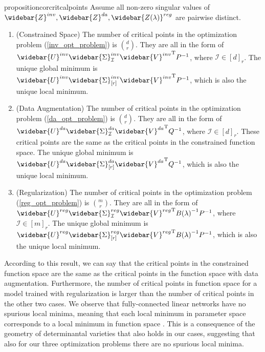 \documentclass{article}
\newcommand{\T}{\mathrm{T}}
\theoremstyle{plain}
\theoremstyle{definition}
\theoremstyle{remark}
\theoremstyle{remark}
\begin{document}
\begin{restatable}{proposition}{corcritcalpoints}
  \label{cor: critical_points}
Assume all non-zero singular values of $\widebar{Z}^{inv}, \widebar{Z}^{da}, \widebar{Z(\lambda)}^{reg}$ are pairwise distinct.
  \begin{enumerate}
    \item (Constrained Space) The number of critical points in the optimization problem (\ref{inv_opt_problem}) is $\binom{d}{r}$. They are all in the form of $\widebar{U}^{inv} \widebar{\Sigma}_{\mathcal{I}}^{inv} {\widebar{V}^{inv}}^{\T}P^{-1}$, where $\mathcal{I} \in [d]_r$. The unique global minimum is $\widebar{U}^{inv} \widebar{\Sigma}_{[r]}^{inv} {\widebar{V}^{inv}}^{\T}P^{-1}$, which is also the unique local minimum.
    \item (Data Augmentation) The number of critical points in the optimization problem (\ref{da_opt_problem}) is $\binom{d}{r}$. They are all in the form of $\widebar{U}^{da} \widebar{\Sigma}_{\mathcal{I}}^{da} {\widebar{V}^{da}}^{\T} Q^{-1}$, where $\mathcal{I} \in [d]_r$. These critical points are the same as the critical points in the constrained function space. The unique global minimum is $\widebar{U}^{da} \widebar{\Sigma}_{[r]}^{da} {\widebar{V}^{da}}^{\T} Q^{-1}$, which is also the unique local minimum.
    \item (Regularization) The number of critical points in the optimization problem (\ref{reg_opt_problem}) is $\binom{m}{r}$. They are all in the form of $\widebar{U}^{reg} \widebar{\Sigma}_{\mathcal{I}}^{reg} {\widebar{V}^{reg}}^{\T} {B(\lambda)}^{-1} P^{-1}$, where $\mathcal{I} \in [m]_r$. The unique global minimum is $\widebar{U}^{reg} \widebar{\Sigma}_{[r]}^{reg} {\widebar{V}^{reg}}^{\T} {B(\lambda)}^{-1} P^{-1}$, which is also the unique local minimum.
  \end{enumerate}
\end{restatable}
According to this result, we can say that the critical points in the constrained function space are the same as the critical points in the function space with data augmentation. 
Furthermore, the number of critical points in function space for a model trained with regularization is larger than the number of critical points in the other two cases. 
We observe that fully-connected linear networks have no spurious local minima, meaning that each local minimum in parameter space corresponds to a local minimum in function space \citep{Trager2020Pure}. 
This is a consequence of the geometry of determinantal varieties that also holds in our cases, suggesting that also for our three optimization problems there are no spurious local minima.
\end{document}
